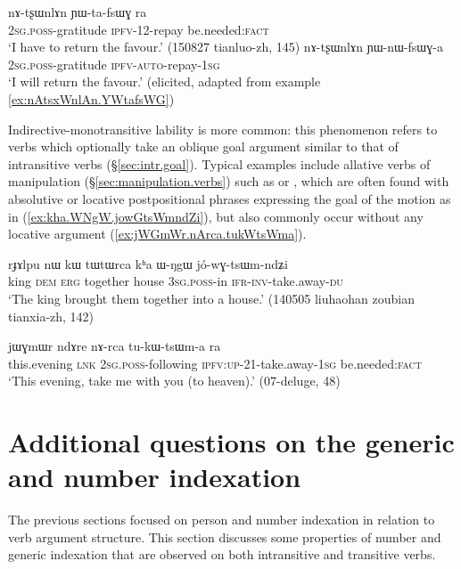 \begin{exe}
\ex 
\begin{xlist}
\ex \label{ex:nAtsxWnlAn.YWtafsWG}
\gll  nɤ-tʂɯnlɤn ɲɯ-ta-fsɯɣ ra \\
\textsc{2sg}.\textsc{poss}-gratitude \textsc{ipfv}-1\fl{}2-repay be.needed:\textsc{fact} \\
\glt `I have to return the favour.' (150827 tianluo-zh, 145)
\ex \label{ex:nAtsxWnlAn.YWnWfsWGa}
\gll nɤ-tʂɯnlɤn ɲɯ-nɯ-fsɯɣ-a \\
\textsc{2sg}.\textsc{poss}-gratitude \textsc{ipfv}-\textsc{auto}-repay-\textsc{1sg} \\
\glt `I will return the favour.' (elicited, adapted from example \ref{ex:nAtsxWnlAn.YWtafsWG})
\end{xlist}
\end{exe}

Indirective-monotransitive lability is more common:  this phenomenon refers to verbs which optionally take an oblique goal argument similar to that of intransitive verbs (§\ref{sec:intr.goal}). Typical examples include allative verbs of manipulation (§\ref{sec:manipulation.verbs}) such as  or , which are often found with absolutive or locative postpositional phrases expressing the goal of the motion as in (\ref{ex:kha.WNgW.jowGtsWmndZi}), but also commonly occur without any locative argument (\ref{ex:jWGmWr.nArca.tukWtsWma}).
 
 \begin{exe}
\ex \label{ex:kha.WNgW.jowGtsWmndZi}
\gll rɟɤlpu nɯ kɯ tɯtɯrca kʰa ɯ-ŋgɯ jó-wɣ-tsɯm-ndʑi  \\
king \textsc{dem} \textsc{erg} together house \textsc{3sg}.\textsc{poss}-in \textsc{ifr}-\textsc{inv}-take.away-\textsc{du} \\
\glt `The king brought them together into a house.' (140505 liuhaohan zoubian tianxia-zh, 142)
\end{exe}

\begin{exe}
\ex \label{ex:jWGmWr.nArca.tukWtsWma}
\gll jɯɣmɯr ndɤre nɤ-rca tu-kɯ-tsɯm-a ra \\
this.evening \textsc{lnk} \textsc{2sg}.\textsc{poss}-following \textsc{ipfv}:\textsc{up}-2\fl {}1-take.away-\textsc{1sg} be.needed:\textsc{fact} \\
\glt `This evening, take me with you (to heaven).' (07-deluge, 48)
\end{exe}

\section{Additional questions on the  generic and number indexation}
The previous sections focused on person and number indexation in relation to  verb argument structure. This section discusses some properties of number and generic indexation that are observed on both intransitive and transitive verbs.

